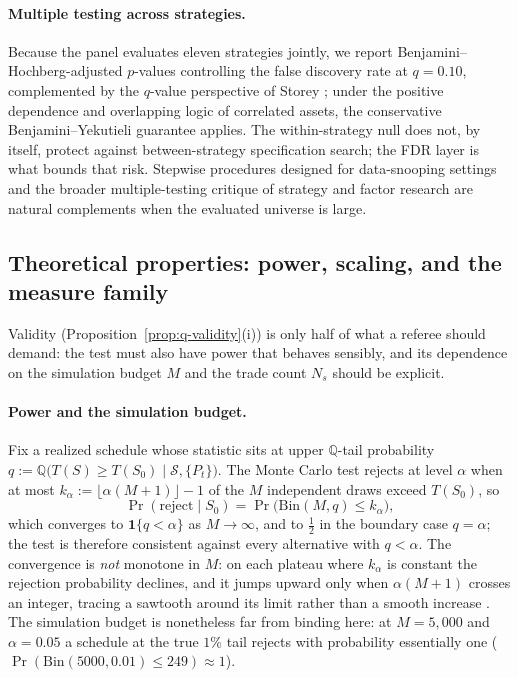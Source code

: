 \documentclass[preprint,12pt]{elsarticle}
\theoremstyle{definition}
\begin{document}
\paragraph{Multiple testing across strategies.} Because the panel evaluates eleven strategies jointly, we report Benjamini--Hochberg-adjusted $p$-values \cite{benjaminihochberg1995} controlling the false discovery rate at $q=0.10$, complemented by the $q$-value perspective of Storey \cite{Storey2002}; under the positive dependence and overlapping logic of correlated assets, the conservative Benjamini--Yekutieli guarantee \cite{BenjaminiYekutieli2001} applies. The within-strategy null does not, by itself, protect against between-strategy specification search; the FDR layer is what bounds that risk. Stepwise procedures designed for data-snooping settings \cite{romanowolf2005} and the broader multiple-testing critique of strategy and factor research \cite{harveyliuzhu2016} are natural complements when the evaluated universe is large.

\subsection{Theoretical properties: power, scaling, and the measure family}
\label{sec:theory}

Validity (Proposition~\ref{prop:q-validity}(i)) is only half of what a referee should demand: the test must also have power that behaves sensibly, and its dependence on the simulation budget $M$ and the trade count $N_s$ should be explicit.

\paragraph{Power and the simulation budget.} Fix a realized schedule whose statistic sits at upper $\mathbb{Q}$-tail probability $q:=\mathbb{Q}\big(T(S)\ge T(S_0)\mid\mathcal S,\{P_t\}\big)$. The Monte Carlo test rejects at level $\alpha$ when at most $k_\alpha:=\lfloor\alpha(M+1)\rfloor-1$ of the $M$ independent draws exceed $T(S_0)$, so
\[
\Pr(\text{reject}\mid S_0)=\Pr\big(\mathrm{Bin}(M,q)\le k_\alpha\big),
\]
which converges to $\mathbf 1\{q<\alpha\}$ as $M\to\infty$, and to $\tfrac12$ in the boundary case $q=\alpha$; the test is therefore consistent against every alternative with $q<\alpha$. The convergence is \emph{not} monotone in $M$: on each plateau where $k_\alpha$ is constant the rejection probability declines, and it jumps upward only when $\alpha(M+1)$ crosses an integer, tracing a sawtooth around its limit rather than a smooth increase \cite{Hope1968,Dwass1957}. The simulation budget is nonetheless far from binding here: at $M=5{,}000$ and $\alpha=0.05$ a schedule at the true $1\%$ tail rejects with probability essentially one ($\Pr(\mathrm{Bin}(5000,0.01)\le249)\approx1$).
\end{document}
